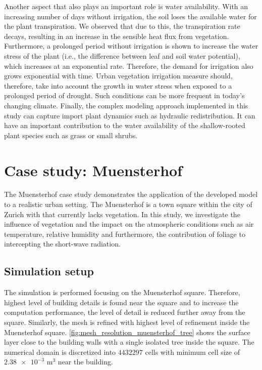 Another aspect that also plays an important role is water availability. With an increasing number of days without irrigation, the soil loses the available water for the plant transpiration. We observed that due to this, the transpiration rate decays, resulting in an increase in the sensible heat flux from vegetation. Furthermore, a prolonged period without irrigation is shown to increase the water stress of the plant (i.e., the difference between leaf and soil water potential), which increases at an exponential rate. Therefore, the demand for irrigation also grows exponential with time. Urban vegetation irrigation measure should, therefore, take into account the growth in water stress when exposed to a prolonged period of drought. Such conditions can be more frequent in today's changing climate. Finally, the complex modeling approach implemented in this study can capture import plant dynamics such as hydraulic redistribution. It can have an important contribution to the water availability of the shallow-rooted plant species such as grass or small shrubs.


\section{Case study: Muensterhof}

The Muensterhof case study demonstrates the application of the developed model to a realistic urban setting. The Muensterhof is a town square within the city of Zurich with that currently lacks vegetation. In this study, we investigate the influence of vegetation and the impact on the atmospheric conditions such as air temperature, relative humidity and furthermore, the contribution of foliage to intercepting the short-wave radiation. 

\subsection{Simulation setup}

The simulation is performed focusing on the Muensterhof square. Therefore, highest level of building details is found near the square and to increase the computation performance, the level of detail is reduced further away from the square. Similarly, the mesh is refined with highest level of refinement inside the Muensterhof square. \cref{fig:mesh_resolution_muensterhof_tree} shows the surface layer close to the building walls with a single isolated tree inside the square. The numerical domain is discretized into $\num{4432297}$ cells with minimum cell size of $\num{2.38e-3}$ m$^{3}$ near the building.

